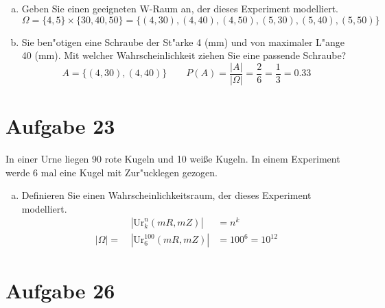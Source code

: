 \documentclass[10pt, oneside]{article}
\begin{document}
\begin{enumerate}[(a)]
    \item Geben Sie einen geeigneten W-Raum an, der dieses Experiment modelliert.
        \begin{equation*}
            \Omega = \{4, 5\} \times \{30, 40, 50\} = \{(4, 30), (4, 40), (4, 50), (5, 30), (5, 40), (5, 50)\}
        \end{equation*}
    \item Sie ben"otigen eine Schraube der St"arke 4 (mm) und von maximaler L"ange 40 (mm).
        Mit welcher Wahrscheinlichkeit ziehen Sie eine passende Schraube?
        \begin{equation*}
            A = \{(4, 30), (4, 40)\} \quad\quad
            P(A) = \dfrac{|A|}{|\Omega|} = \dfrac{2}{6} = \dfrac{1}{3} = 0.33
        \end{equation*}
\end{enumerate}

\section{Aufgabe 23}

In einer Urne liegen 90 rote Kugeln und 10 wei{\ss}e Kugeln. In einem
Experiment werde 6 mal eine Kugel mit Zur"ucklegen gezogen.

\begin{enumerate}[(a)]
    \item \label{itm:23-a} Definieren Sie einen Wahrscheinlichkeitsraum, der dieses Experiment modelliert.
        \begin{equation*}
            \begin{array}{rcl}
                &|\text{Ur}_k^n(mR, mZ)|& = n^k \\[5pt]
                |\Omega| =\ &|\text{Ur}_6^{100}(mR, mZ)|& = 100^6 = 10^{12}
            \end{array}
        \end{equation*}
\end{enumerate}

\section{Aufgabe 26}
\end{document}
